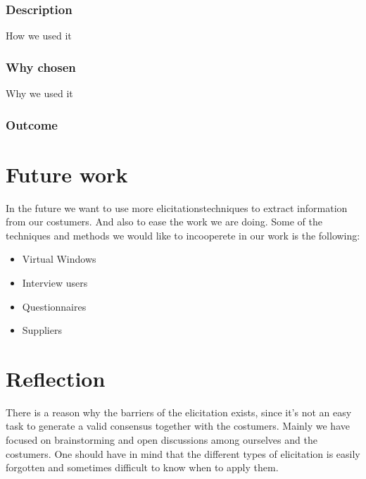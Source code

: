 \documentclass[a4paper]{article}
\begin{document}
    \subsubsection{Description}
    How we used it
    \subsubsection{Why chosen}
    Why we used it
    \subsubsection{Outcome}

  \section{Future work}

  In the future we want to use more elicitationstechniques to extract information from our costumers. And also to ease the work we are doing.
  Some of the techniques and methods we would like to incooperete in our work is the following:
  \begin{itemize}
  	\item Virtual Windows
  	\item Interview users
  	\item Questionnaires
  	\item Suppliers 
  \end{itemize}
 
  \section{Reflection}



	There is a reason why the barriers of the elicitation exists, since it's not an easy task to generate a valid consensus together with the costumers.
	Mainly we have focused on brainstorming and open discussions among ourselves and the costumers. One should have in mind that the different types of elicitation is easily forgotten and sometimes difficult to know when to apply them.
  
\end{document}
